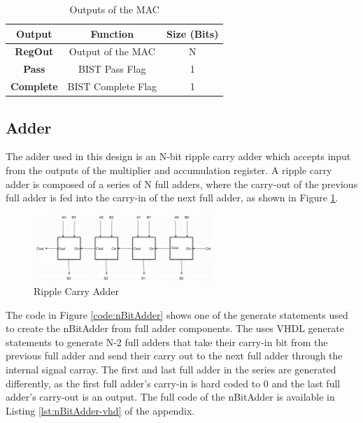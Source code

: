 \documentclass[11pt]{article}
\begin{document}
		\begin{table}[H]
			\centering
			\caption{Outputs of the MAC}
			\label{tab:Outputs}
			\begin{tabular}{|ccc|}
				\hline
				\textbf{}   \textbf{Output}      & \textbf{Function} &  \textbf{Size (Bits)} \\
				\hline
				\textbf{RegOut}  & Output of the MAC & N          \\
				\textbf{Pass}  & BIST Pass Flag & 1            \\ 
				\textbf{Complete}  & BIST Complete Flag & 1        \\ 
				\hline                     
			\end{tabular}
		\end{table}
	

	\subsection{Adder}
	
		The adder used in this design is an N-bit ripple carry adder which accepts input from the outputs of the multiplier and accumulation register. A ripple carry adder is composed of a series of N full adders, where the carry-out of the previous full adder is fed into the carry-in of the next full adder, as shown in Figure \ref{fig:ripple-carry-adder}.
		
		\begin{figure}[H]
			\centering
			\includegraphics[width=0.6\textwidth,height=\dimexpr\textheight-4\baselineskip-\abovecaptionskip-\belowcaptionskip\relax,keepaspectratio]{"Pictures/Ripple Carry Adder"}
			\caption{Ripple Carry Adder}
			\label{fig:ripple-carry-adder}
		\end{figure}
		
		The code in Figure \ref{code:nBitAdder} shows one of the generate statements used to create the nBitAdder from full adder components. The uses VHDL generate statements to generate N-2 full adders that take their carry-in bit from the previous full adder and send their carry out to the next full adder through the internal signal carray. The first and last full adder in the series are generated differently, as the first full adder's carry-in is hard coded to 0 and the last full adder's carry-out is an output. The full code of the nBitAdder is available in Listing \ref{lst:nBitAdder-vhd} of the appendix.
		
\end{document}
